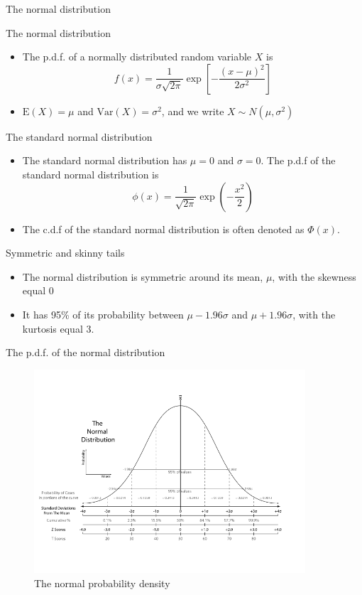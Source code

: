 \documentclass[presentation]{beamer}
\begin{document}
\begin{frame}[label={sec:org784392f}]{The normal distribution}
\begin{block}{The normal distribution}
\begin{itemize}
\item The p.d.f. of a normally distributed random variable \(X\) is
\[ f(x) =
  \frac{1}{\sigma\sqrt{2\pi}}\exp\left[-\frac{(x-\mu)^{2}}{2\sigma^{2}}\right]
  \]
\item \(\mathrm{E}(X) = \mu\) and \(\mathrm{Var}(X) = \sigma^{2}\), and we write \(X \sim N(\mu, \sigma^{2})\)
\end{itemize}
\end{block}

\begin{block}{The standard normal distribution}
\begin{itemize}
\item The standard normal distribution has \(\mu = 0\) and \(\sigma = 0\). The p.d.f of the
standard normal distribution is
\[
  \phi(x) = \frac{1}{\sqrt{2\pi}}\exp\left(-\frac{x^2}{2}\right)
  \]
\item The c.d.f of the standard normal distribution is often denoted as
\(\Phi(x)\).
\end{itemize}
\end{block}
\end{frame}

\begin{frame}[label={sec:org649f43a}]{Symmetric and skinny tails}
\begin{itemize}
\item The normal distribution is symmetric around its mean, \(\mu\), with the
skewness equal 0
\item It has 95\% of its probability between
\(\mu-1.96\sigma\) and \(\mu+1.96\sigma\), with the kurtosis
equal 3.
\end{itemize}
\end{frame}

\begin{frame}[label={sec:orgae24f4e}]{The p.d.f. of the normal distribution}
\begin{figure}[htbp]
\centering
\includegraphics[width=0.9\textwidth]{figure/Normal-distribution-curve.png}
\caption{\label{fig:org1b18b7c}
The normal probability density}
\end{figure}
\end{frame}
\end{document}
